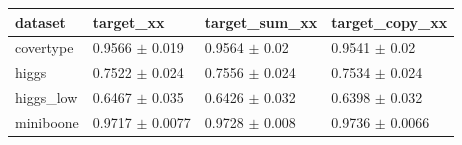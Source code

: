\begin{tabular}{llll}
\toprule
dataset & target\_xx & target\_sum\_xx & target\_copy\_xx \\
\midrule
covertype & 0.9566 $\pm$ 0.019 & 0.9564 $\pm$ 0.02 & 0.9541 $\pm$ 0.02 \\
higgs & 0.7522 $\pm$ 0.024 & 0.7556 $\pm$ 0.024 & 0.7534 $\pm$ 0.024 \\
higgs\_low & 0.6467 $\pm$ 0.035 & 0.6426 $\pm$ 0.032 & 0.6398 $\pm$ 0.032 \\
miniboone & 0.9717 $\pm$ 0.0077 & 0.9728 $\pm$ 0.008 & 0.9736 $\pm$ 0.0066 \\
\bottomrule
\end{tabular}
